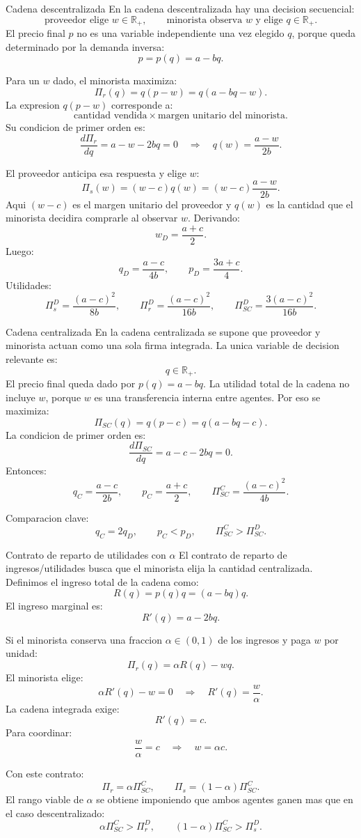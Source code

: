 \begin{materia}{Cadena descentralizada}
En la cadena descentralizada hay una decision secuencial:
\[
\text{proveedor elige } w\in\mathbb{R}_+,
\qquad
\text{minorista observa } w \text{ y elige } q\in\mathbb{R}_+.
\]
El precio final \(p\) no es una variable independiente una vez elegido \(q\), porque queda determinado por la demanda inversa:
\[
p=p(q)=a-bq.
\]

Para un \(w\) dado, el minorista maximiza:
\[
\Pi_r(q)=q(p-w)=q(a-bq-w).
\]
La expresion \(q(p-w)\) corresponde a:
\[
\text{cantidad vendida}\times\text{margen unitario del minorista}.
\]
Su condicion de primer orden es:
\[
\frac{d\Pi_r}{dq}=a-w-2bq=0
\quad\Rightarrow\quad
q(w)=\frac{a-w}{2b}.
\]

El proveedor anticipa esa respuesta y elige \(w\):
\[
\Pi_s(w)=(w-c)q(w)
=(w-c)\frac{a-w}{2b}.
\]
Aqui \((w-c)\) es el margen unitario del proveedor y \(q(w)\) es la cantidad que el minorista decidira comprarle al observar \(w\).
Derivando:
\[
w_D=\frac{a+c}{2}.
\]
Luego:
\[
q_D=\frac{a-c}{4b},
\qquad
p_D=\frac{3a+c}{4}.
\]
Utilidades:
\[
\Pi_s^D=\frac{(a-c)^2}{8b},
\qquad
\Pi_r^D=\frac{(a-c)^2}{16b},
\qquad
\Pi_{SC}^D=\frac{3(a-c)^2}{16b}.
\]
\end{materia}

\begin{materia}{Cadena centralizada}
En la cadena centralizada se supone que proveedor y minorista actuan como una sola firma integrada. La unica variable de decision relevante es:
\[
q\in\mathbb{R}_+.
\]
El precio final queda dado por \(p(q)=a-bq\). La utilidad total de la cadena no incluye \(w\), porque \(w\) es una transferencia interna entre agentes. Por eso se maximiza:
\[
\Pi_{SC}(q)=q(p-c)=q(a-bq-c).
\]
La condicion de primer orden es:
\[
\frac{d\Pi_{SC}}{dq}=a-c-2bq=0.
\]
Entonces:
\[
q_C=\frac{a-c}{2b},
\qquad
p_C=\frac{a+c}{2},
\qquad
\Pi_{SC}^C=\frac{(a-c)^2}{4b}.
\]

Comparacion clave:
\[
q_C=2q_D,
\qquad
p_C<p_D,
\qquad
\Pi_{SC}^C>\Pi_{SC}^D.
\]
\end{materia}

\begin{materia}{Contrato de reparto de utilidades con \(\alpha\)}
El contrato de reparto de ingresos/utilidades busca que el minorista elija la cantidad centralizada. Definimos el ingreso total de la cadena como:
\[
R(q)=p(q)q=(a-bq)q.
\]
El ingreso marginal es:
\[
R'(q)=a-2bq.
\]

Si el minorista conserva una fraccion \(\alpha\in(0,1)\) de los ingresos y paga \(w\) por unidad:
\[
\Pi_r(q)=\alpha R(q)-wq.
\]
El minorista elige:
\[
\alpha R'(q)-w=0
\quad\Rightarrow\quad
R'(q)=\frac{w}{\alpha}.
\]
La cadena integrada exige:
\[
R'(q)=c.
\]
Para coordinar:
\[
\frac{w}{\alpha}=c
\quad\Rightarrow\quad
\boxed{w=\alpha c}.
\]

Con este contrato:
\[
\Pi_r=\alpha\Pi_{SC}^C,
\qquad
\Pi_s=(1-\alpha)\Pi_{SC}^C.
\]
El rango viable de \(\alpha\) se obtiene imponiendo que ambos agentes ganen mas que en el caso descentralizado:
\[
\alpha\Pi_{SC}^C>\Pi_r^D,
\qquad
(1-\alpha)\Pi_{SC}^C>\Pi_s^D.
\]
\end{materia}

